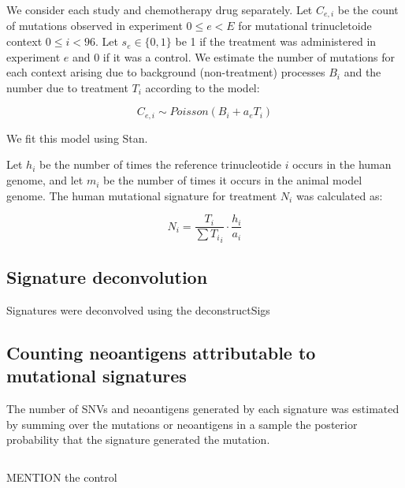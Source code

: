 We consider each study and chemotherapy drug separately. Let $C_{e,i}$ be the count of mutations observed in experiment $0 \leq e \lt E$ for mutational trinucletoide context $0 \leq i \lt 96$. Let $s_e \in \{0,1\}$ be 1 if the treatment was administered in experiment $e$ and 0 if it was a control. We estimate the number of mutations for each context arising due to background (non-treatment) processes $B_i$ and the number due to treatment $T_i$ according to the model:

\[
C_{e,i} \sim \mathit{Poisson}(B_i + a_e T_i)
\]

We fit this model using Stan\cite{Gelman_2015}.

Let $h_i$ be the number of times the reference trinucleotide $i$ occurs in the human genome, and let $m_i$ be the number of times it occurs in the animal model genome. The human mutational signature for treatment $N_i$ was calculated as:

\[
N_i = \frac{T_i}{\sum{T_i}_i} \cdot \frac{h_i}{a_i}
\]


\subsection*{Signature deconvolution}
Signatures were deconvolved using the deconstructSigs\cite{Rosenthal_2016}

\subsection*{Counting neoantigens attributable to mutational signatures}
The number of SNVs and neoantigens generated by each signature was estimated by summing over the mutations or neoantigens in a sample the posterior probability that the signature generated the mutation.

\[



\]


MENTION the control



